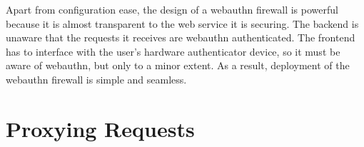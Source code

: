 




Apart from configuration ease, the design of a webauthn firewall is powerful because it is almost transparent to the web service it is securing. The backend is unaware that the requests it receives are webauthn authenticated. The frontend has to interface with the user's hardware authenticator device, so it must be aware of webauthn, but only to a minor extent. As a result, deployment of the webauthn firewall is simple and seamless.




\section{Proxying Requests}\label{Sec:ProxyingRequests}

